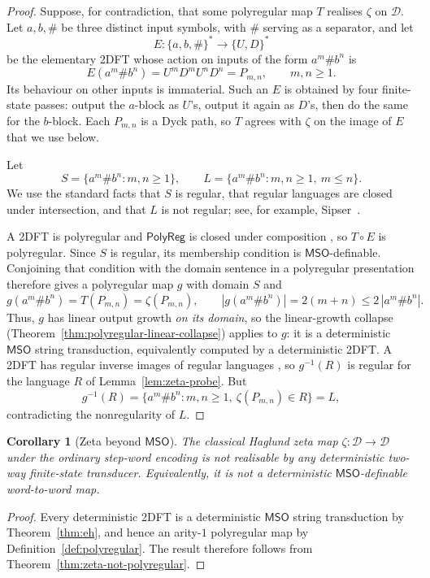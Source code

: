 \documentclass[11pt]{article}
\newtheorem{corollary}[theorem]{Corollary}
\theoremstyle{definition}
\newcommand{\D}{\mathcal D}
\newcommand{\MSO}{\mathsf{MSO}}
\newcommand{\polyreg}{\mathsf{PolyReg}}
\begin{document}
\begin{proof}
Suppose, for contradiction, that some polyregular map $T$ realises $\zeta$ on
$\D$.  Let $a,b,\#$ be three distinct input symbols, with $\#$ serving as a
separator, and let
\[
   E\colon\{a,b,\#\}^*\longrightarrow\{U,D\}^*
\]
be the elementary 2DFT whose action on inputs of the form $a^m\#b^n$ is
\[
   E(a^m\#b^n)=U^mD^mU^nD^n=P_{m,n},\qquad m,n\ge 1.
\]
Its behaviour on other inputs is immaterial.  Such an $E$ is obtained by four
finite-state passes: output the $a$-block as $U$'s, output it again as $D$'s,
then do the same for the $b$-block.  Each $P_{m,n}$ is a Dyck path, so $T$
agrees with $\zeta$ on the image of $E$ that we use below.

Let
\[
   S=\{a^m\#b^n:m,n\ge 1\},
   \qquad
   L=\{a^m\#b^n:m,n\ge 1,\ m\le n\}.
\]
We use the standard facts that $S$ is regular, that regular languages are
closed under intersection, and that $L$ is not regular; see, for example,
Sipser~\cite[Chapter~1]{Sipser2013}.

A 2DFT is polyregular and $\polyreg$ is closed under composition
\cite{Bojanczyk2018}, so $T\circ E$ is polyregular.  Since $S$ is regular, its
membership condition is $\MSO$-definable.  Conjoining that condition with the
domain sentence in a polyregular presentation therefore gives a polyregular
map $g$ with domain $S$ and
\[
   g(a^m\#b^n)=T(P_{m,n})=\zeta(P_{m,n}),\qquad
   |g(a^m\#b^n)|=2(m+n)\le 2\,|a^m\#b^n|.
\]
Thus, $g$ has linear output growth \emph{on its domain}, so the linear-growth
collapse (Theorem~\ref{thm:polyregular-linear-collapse}) applies to $g$: it is
a deterministic $\MSO$ string transduction, equivalently computed by a
deterministic 2DFT\@.  A 2DFT has regular inverse images of regular languages
\cite{EngelfrietHoogeboom2001}, so $g^{-1}(R)$ is regular for the language $R$
of Lemma~\ref{lem:zeta-probe}.  But
\[
   g^{-1}(R)=\{a^m\#b^n:m,n\ge 1,\ \zeta(P_{m,n})\in R\}=L,
\]
contradicting the nonregularity of $L$.
\end{proof}

\begin{corollary}[Zeta beyond $\MSO$]\label{cor:zeta-not-regular}
The classical Haglund zeta map $\zeta\colon\D\to\D$ under the ordinary
step-word encoding is not realisable by any deterministic two-way finite-state
transducer.  Equivalently, it is not a deterministic $\MSO$-definable
word-to-word map.
\end{corollary}

\begin{proof}
Every deterministic 2DFT is a deterministic $\MSO$ string transduction by
Theorem~\ref{thm:eh}, and hence an arity-$1$ polyregular map by
Definition~\ref{def:polyregular}.  The result therefore follows from
Theorem~\ref{thm:zeta-not-polyregular}.
\end{proof}
\end{document}
